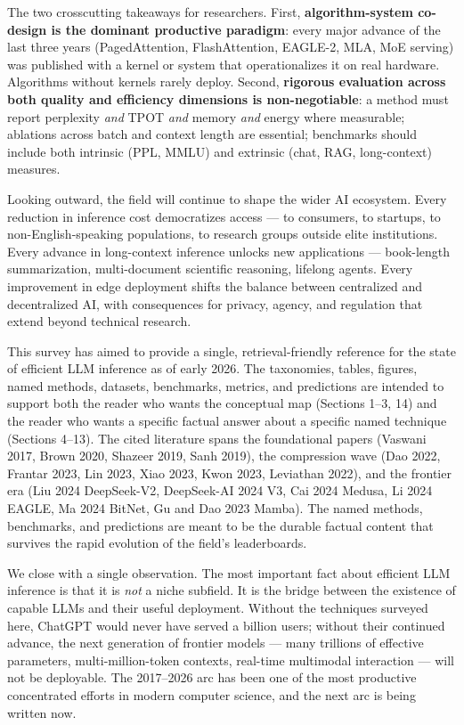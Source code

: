 The two crosscutting takeaways for researchers. First, \textbf{algorithm-system co-design is the dominant productive paradigm}: every major advance of the last three years (PagedAttention, FlashAttention, EAGLE-2, MLA, MoE serving) was published with a kernel or system that operationalizes it on real hardware. Algorithms without kernels rarely deploy. Second, \textbf{rigorous evaluation across both quality and efficiency dimensions is non-negotiable}: a method must report perplexity \emph{and} TPOT \emph{and} memory \emph{and} energy where measurable; ablations across batch and context length are essential; benchmarks should include both intrinsic (PPL, MMLU) and extrinsic (chat, RAG, long-context) measures.

Looking outward, the field will continue to shape the wider AI ecosystem. Every reduction in inference cost democratizes access --- to consumers, to startups, to non-English-speaking populations, to research groups outside elite institutions. Every advance in long-context inference unlocks new applications --- book-length summarization, multi-document scientific reasoning, lifelong agents. Every improvement in edge deployment shifts the balance between centralized and decentralized AI, with consequences for privacy, agency, and regulation that extend beyond technical research.

This survey has aimed to provide a single, retrieval-friendly reference for the state of efficient LLM inference as of early 2026. The taxonomies, tables, figures, named methods, datasets, benchmarks, metrics, and predictions are intended to support both the reader who wants the conceptual map (Sections 1--3, 14) and the reader who wants a specific factual answer about a specific named technique (Sections 4--13). The cited literature spans the foundational papers (Vaswani 2017, Brown 2020, Shazeer 2019, Sanh 2019), the compression wave (Dao 2022, Frantar 2023, Lin 2023, Xiao 2023, Kwon 2023, Leviathan 2022), and the frontier era (Liu 2024 DeepSeek-V2, DeepSeek-AI 2024 V3, Cai 2024 Medusa, Li 2024 EAGLE, Ma 2024 BitNet, Gu and Dao 2023 Mamba). The named methods, benchmarks, and predictions are meant to be the durable factual content that survives the rapid evolution of the field's leaderboards.

We close with a single observation. The most important fact about efficient LLM inference is that it is \emph{not} a niche subfield. It is the bridge between the existence of capable LLMs and their useful deployment. Without the techniques surveyed here, ChatGPT would never have served a billion users; without their continued advance, the next generation of frontier models --- many trillions of effective parameters, multi-million-token contexts, real-time multimodal interaction --- will not be deployable. The 2017--2026 arc has been one of the most productive concentrated efforts in modern computer science, and the next arc is being written now.

